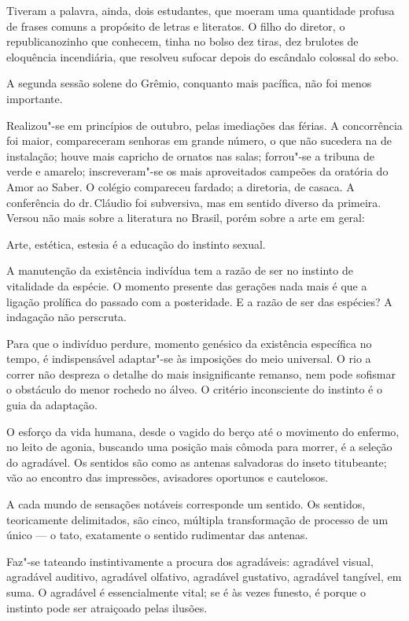 Tiveram a palavra, ainda, dois
estudantes, que moeram uma quantidade profusa de frases comuns a 
propósito de letras e literatos. O filho do diretor, o republicanozinho
que conhecem, tinha no bolso dez tiras, dez brulotes de eloquência
incendiária, que resolveu sufocar depois do escândalo colossal do sebo.

A segunda sessão solene do Grêmio, conquanto mais pacífica, não foi
menos importante. 

Realizou"-se em princípios de outubro, pelas
imediações das férias. A concorrência foi maior, compareceram senhoras
em grande número, o que não sucedera na de instalação; houve mais
capricho de ornatos nas salas; forrou"-se a tribuna de verde e
amarelo; inscreveram"-se os mais aproveitados campeões da oratória do
Amor ao Saber. O colégio compareceu fardado; a diretoria, de casaca. A
conferência do dr.\,Cláudio foi subversiva, mas em sentido diverso da
primeira. Versou não mais sobre a literatura no Brasil, porém sobre a
arte em geral:

\noindent\dotfill

Arte, estética, estesia é a educação do instinto sexual. 

A manutenção
da existência indivídua tem a razão de ser no instinto de vitalidade da
espécie. O momento presente das gerações nada mais é que a ligação
prolífica do passado com a posteridade. E a razão de ser das espécies?
A indagação não perscruta. 

Para que o indivíduo perdure, momento
genésico da existência específica no tempo, é indispensável
adaptar"-se às imposições do meio universal. O rio a correr não
despreza o detalhe do mais insignificante remanso, nem pode sofismar o
obstáculo do menor rochedo no álveo. O critério inconsciente do
instinto é o guia da adaptação. 

O esforço da vida humana, desde o
vagido do berço até o movimento do enfermo, no leito de agonia,
buscando uma posição mais cômoda para morrer, é a seleção do agradável.
Os sentidos são como as antenas salvadoras do inseto titubeante; vão ao
encontro das impressões, avisadores oportunos e cautelosos. 

A cada
mundo de sensações notáveis corresponde um sentido. Os sentidos,
teoricamente delimitados, são cinco, múltipla transformação de processo
de um único --- o tato, exatamente o sentido rudimentar das antenas.

Faz"-se tateando instintivamente a procura dos agradáveis: agradável
visual, agradável auditivo, agradável olfativo, agradável gustativo,
agradável tangível, em suma. O agradável é essencialmente vital; se é
às vezes funesto, é porque o instinto pode ser atraiçoado pelas
ilusões. 

